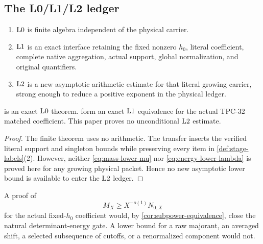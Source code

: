 \subsection{The L0/L1/L2 ledger}

\begin{definition}
\label{def:stage-labels}
\begin{enumerate}[label=(\arabic*),leftmargin=2.2em]
\item \(\mathrm{L0}\) is finite algebra independent of the physical
carrier.
\item \(\mathrm{L1}\) is an exact interface retaining the fixed nonzero
\(h_0\), literal coefficient, complete native aggregation, actual
support, global normalization, and original quantifiers.
\item \(\mathrm{L2}\) is a new asymptotic arithmetic estimate for that
literal growing carrier, strong enough to reduce a positive exponent
in the physical ledger.
\end{enumerate}
\end{definition}

\begin{proposition}
\label{prop:stage-classification}
 is an exact \(\mathrm{L0}\) theorem.
 form an exact
\(\mathrm{L1}\) equivalence for the actual TPC-32 matched coefficient.  This
paper proves no unconditional \(\mathrm{L2}\) estimate.
\end{proposition}

\begin{proof}
The finite theorem uses no arithmetic.  The transfer inserts the
verified literal support and singleton bounds while preserving every
item in \cref{def:stage-labels}(2).  However, neither
\eqref{eq:mass-lower-mu} nor
\eqref{eq:energy-lower-lambda} is proved here for any growing
physical packet.  Hence no new asymptotic lower bound is available to
enter the \(\mathrm{L2}\) ledger.
\end{proof}

\begin{remark}
A proof of
\[
 M_X\ge X^{-o(1)}N_{0,X}
\]
for the actual fixed-\(h_0\) coefficient would, by
\cref{cor:subpower-equivalence}, close the natural determinant-energy
gate.  A lower bound for a raw majorant, an averaged shift, a selected
subsequence of cutoffs, or a renormalized component would not.
\end{remark}

